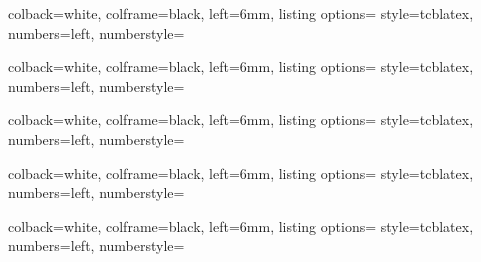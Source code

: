 \begin{tcblisting}{
    colback=white,
    colframe=black,
    left=6mm,
    listing options={
        style=tcblatex,
        numbers=left,
        numberstyle=\tiny\color{red!75!black}
    }
}
\begin{Definition}[titre]

	\contenuExempleEnv

\end{Definition}
\end{tcblisting}
%
\newpage

%
\newpage
\begin{tcblisting}{
    colback=white,
    colframe=black,
    left=6mm,
    listing options={
        style=tcblatex,
        numbers=left,
        numberstyle=\tiny\color{red!75!black}
    }
}
\begin{Notation}[titre]

	\contenuExempleEnv

\end{Notation}
\end{tcblisting}
%
\newpage
\begin{tcblisting}{
    colback=white,
    colframe=black,
    left=6mm,
    listing options={
        style=tcblatex,
        numbers=left,
        numberstyle=\tiny\color{red!75!black}
    }
}
\begin{Vocabulaire}[titre]

	\contenuExempleEnv

\end{Vocabulaire}
\end{tcblisting}
%
\newpage
\begin{tcblisting}{
    colback=white,
    colframe=black,
    left=6mm,
    listing options={
        style=tcblatex,
        numbers=left,
        numberstyle=\tiny\color{red!75!black}
    }
}
\begin{Aide}[titre]

	\contenuExempleEnv

\end{Aide}
\end{tcblisting}
%
\newpage
\begin{tcblisting}{
    colback=white,
    colframe=black,
    left=6mm,
    listing options={
        style=tcblatex,
        numbers=left,
        numberstyle=\tiny\color{red!75!black}
    }
}
\begin{Demonstration}[titre]

	\contenuExempleEnv
\end{Demonstration}
\end{tcblisting}
